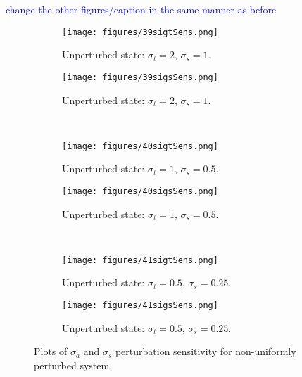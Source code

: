 \documentclass{article}
\newcommand{\sigt}{\sigma_t}
\newcommand{\sigs}{\sigma_s}
\newcommand{\siga}{\sigma_a}
\newcommand{\comment}[2]{\marginpar{\textcolor{#2}{$\star$}}\textcolor{#2}{#1}\newline}
\newcommand{\jcr}[1]{\comment{#1}{blue}}
\newcommand{\jcr}[1]{\phantom{a}}
\begin{document}
\jcr{change the other figures/caption in the same manner as before}

\begin{figure}[H]
\label{InHomoPertt}
\centering
\begin{subfigure}{.5\textwidth}
  \centering
  \texttt{[image: figures/39sigtSens.png]}
  \caption{Unperturbed state: $\sigt=2$, $\sigs=1$.}
  \label{fig:sfig1}
\end{subfigure}%
\begin{subfigure}{.5\textwidth}
  \centering
  \texttt{[image: figures/39sigsSens.png]}
  \caption{Unperturbed state: $\sigt=2$, $\sigs=1$.}
  \label{fig:sfig4}
\end{subfigure}%
\\
\begin{subfigure}{.5\textwidth}
  \centering
  \texttt{[image: figures/40sigtSens.png]}
  \caption{Unperturbed state: $\sigt=1$, $\sigs=0.5$.}
  \label{fig:sfig2}
\end{subfigure}%
\begin{subfigure}{.5\textwidth}
  \centering
  \texttt{[image: figures/40sigsSens.png]}
  \caption{Unperturbed state: $\sigt=1$, $\sigs=0.5$.}
  \label{fig:sfig5}
\end{subfigure}%
\\
\begin{subfigure}{.5\textwidth}
  \centering
  \texttt{[image: figures/41sigtSens.png]}
  \caption{Unperturbed state: $\sigt=0.5$, $\sigs=0.25$.}
  \label{fig:sfig3}
\end{subfigure}%
\begin{subfigure}{.5\textwidth}
  \centering
  \texttt{[image: figures/41sigsSens.png]}
  \caption{Unperturbed state: $\sigt=0.5$, $\sigs=0.25$.}
  \label{fig:sfig6}
\end{subfigure}%
\caption{Plots of $\siga$ and $\sigs$ perturbation sensitivity for non-uniformly perturbed system.}
\label{fig:fig}
\end{figure}
\end{document}
